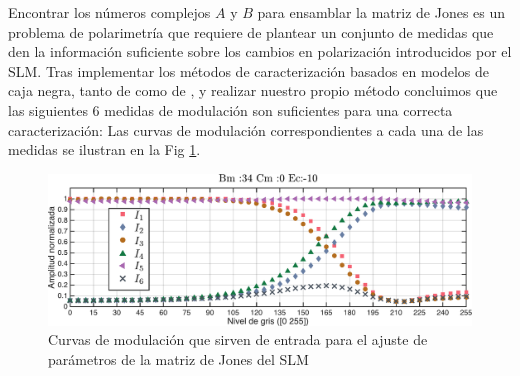 Encontrar los números complejos $A$ y $B$ para ensamblar la
matriz de Jones es un problema de polarimetría que requiere de
plantear un conjunto de medidas que den la información suficiente
sobre los cambios en polarización introducidos por el SLM. 
Tras implementar los métodos de caracterización basados en modelos de
caja negra, tanto de  como de
, y realizar nuestro propio método concluimos que
las siguientes 6 medidas de modulación son suficientes para una
correcta caracterización:
Las curvas de modulación correspondientes a cada una de las medidas se
ilustran en la Fig \ref{fig:six_input_measures}. 
\begin{figure}[h!]
\centering
\includegraphics[scale=.55]{six_input_measures.pdf}
\caption[Curvas de modulación que sirven de entrada para el ajuste de
parámetros de la matriz de Jones del SLM]{Curvas de modulación que sirven de entrada para el ajuste de
parámetros de la matriz de Jones del SLM}
\label{fig:six_input_measures}
\end{figure}
